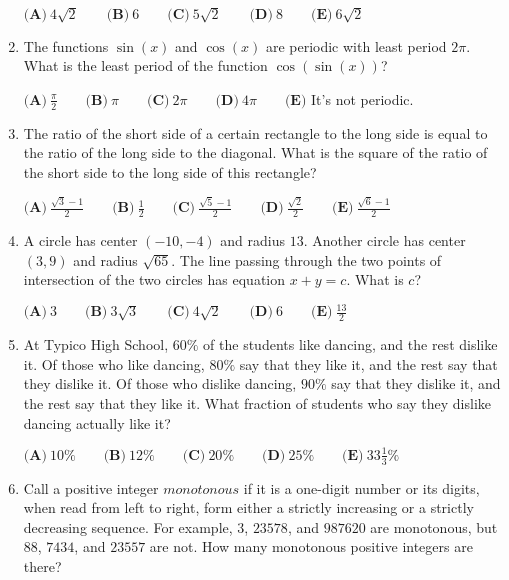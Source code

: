 \documentclass{article}
\begin{document}
\begin{enumerate}[label=\arabic*., itemsep=0.5em]
\(\textbf{(A)}\ 4\sqrt{2} \qquad \textbf{(B)}\ 6\qquad \textbf{(C)}\ 5\sqrt{2}\qquad \textbf{(D)}\ 8\qquad \textbf{(E)}\ 6\sqrt{2}\)\par \vspace{0.5em}\item The functions \(\sin(x)\) and \(\cos(x)\) are periodic with least period \(2\pi\). What is the least period of the function \(\cos(\sin(x))\)?

\(\textbf{(A)}\ \frac{\pi}{2}\qquad\textbf{(B)}\ \pi\qquad\textbf{(C)}\ 2\pi \qquad\textbf{(D)}\ 4\pi \qquad\textbf{(E)}\) It's not periodic.\par \vspace{0.5em}\item The ratio of the short side of a certain rectangle to the long side is equal to the ratio of the long side to the diagonal. What is the square of the ratio of the short side to the long side of this rectangle?

\(\textbf{(A)}\ \frac{\sqrt{3}-1}{2}\qquad\textbf{(B)}\ \frac{1}{2}\qquad\textbf{(C)}\ \frac{\sqrt{5}-1}{2} \qquad\textbf{(D)}\ \frac{\sqrt{2}}{2} \qquad\textbf{(E)}\ \frac{\sqrt{6}-1}{2}\)\par \vspace{0.5em}\item A circle has center \((-10,-4)\) and radius \(13\). Another circle has center \((3,9)\) and radius \(\sqrt{65}\). The line passing through the two points of intersection of the two circles has equation \(x + y = c\). What is \(c\)?

\(\textbf{(A)}\ 3\qquad\textbf{(B)}\ 3\sqrt{3}\qquad\textbf{(C)}\ 4\sqrt{2}\qquad\textbf{(D)}\ 6\qquad\textbf{(E)}\ \frac{13}{2}\)\par \vspace{0.5em}\item At Typico High School, \(60\%\) of the students like dancing, and the rest dislike it. Of those who like dancing, \(80\%\) say that they like it, and the rest say that they dislike it. Of those who dislike dancing, \(90\%\) say that they dislike it, and the rest say that they like it. What fraction of students who say they dislike dancing actually like it?

\(\textbf{(A)}\ 10\%\qquad\textbf{(B)}\ 12\%\qquad\textbf{(C)}\ 20\%\qquad\textbf{(D)}\ 25\%\qquad\textbf{(E)}\ 33\frac{1}{3}\%\)\par \vspace{0.5em}\item Call a positive integer \(monotonous\) if it is a one-digit number or its digits, when read from left to right, form either a strictly increasing or a strictly decreasing sequence. For example, \(3\), \(23578\), and \(987620\) are monotonous, but \(88\), \(7434\), and \(23557\) are not. How many monotonous positive integers are there?


\end{enumerate}
\end{document}
